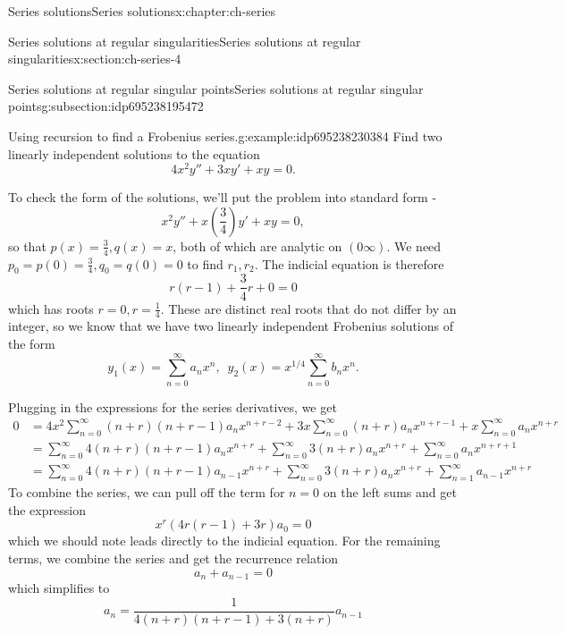 \documentclass[oneside,10pt,]{book}
\numberwithin{equation}{section}
\numberwithin{equation}{section}
\newcommand{\amp}{&}
\begin{document}
\begin{chapterptx}{Series solutions}{}{Series solutions}{}{}{x:chapter:ch-series}
\begin{sectionptx}{Series solutions at regular singularities}{}{Series solutions at regular singularities}{}{}{x:section:ch-series-4}
\begin{subsectionptx}{Series solutions at regular singular points}{}{Series solutions at regular singular points}{}{}{g:subsection:idp695238195472}
\begin{example}{Using recursion to find a Frobenius series.}{g:example:idp695238230384}
Find two linearly independent solutions to the equation%
\begin{equation}
4x^2 y'' + 3 x y' + xy = 0.\label{x:men:ex-frob}
\end{equation}
%
\par
To check the form of the solutions, we'll put the problem into standard form -%
\begin{equation*}
x^2 y'' + x (\frac{3}{4}) y' + x y = 0,
\end{equation*}
so that \(p (x) = \frac{3}{4}, q(x) = x\), both of which are analytic on \((0 \infty)\). We need \(p_0 = p(0) = \frac{3}{4},  q_0 = q(0) = 0\) to find \(r_1, r_2\). The indicial equation is therefore%
\begin{equation*}
r(r-1) + \frac{3}{4} r + 0 = 0
\end{equation*}
which has roots \(r = 0, r = \frac{1}{4}\). These are distinct real roots that do not differ by an integer, so we know that we have two linearly independent Frobenius solutions of the form%
\begin{equation*}
y_1(x) = \sum_{n=0}^\infty a_n x^n, \,\,\, y_2(x) = x^{1/4} \sum_{n=0}^\infty b_n x^n.
\end{equation*}
%
\par
Plugging in the expressions for the series derivatives, we get%
\begin{align*}
0 \amp = 4x^2 \sum_{n=0}^\infty (n+r)(n+r - 1) a_n x^{n + r - 2} + 3 x \sum_{n=0}^\infty (n+r) a_n x^{n + r - 1} + x \sum_{n=0}^\infty a_n x^{n + r}\\
\amp = \sum_{n=0}^\infty 4(n+r)(n+r -1) a_n x^{n + r} + \sum_{n=0}^\infty 3(n+r) a_n x^{n + r} +  \sum_{n=0}^\infty a_n x^{n + r + 1}\\
\amp = \sum_{n=0}^\infty 4(n+r)(n+r -1) a_{n - 1} x^{n + r} + \sum_{n=0}^\infty 3(n+r) a_n x^{n + r} +  \sum_{n=1}^\infty a_{n - 1} x^{n + r}
\end{align*}
To combine the series, we can pull off the term for \(n=0\) on the left sums and get the expression%
\begin{equation*}
x^r (4r(r-1) + 3r)a_0 = 0
\end{equation*}
which we should note leads directly to the indicial equation. For the remaining terms, we combine the series and get the recurrence relation%
\begin{equation*}
[4(n + r)(n+r - 1) + 3(n+r)]a_n + a_{n-1} = 0
\end{equation*}
which simplifies to%
\begin{equation*}
a_n = \frac{1}{4(n+r)(n+r - 1) + 3(n+ r)} a_{n-1}

\end{equation*}
\end{example}
\end{subsectionptx}
\end{sectionptx}
\end{chapterptx}
\end{document}
